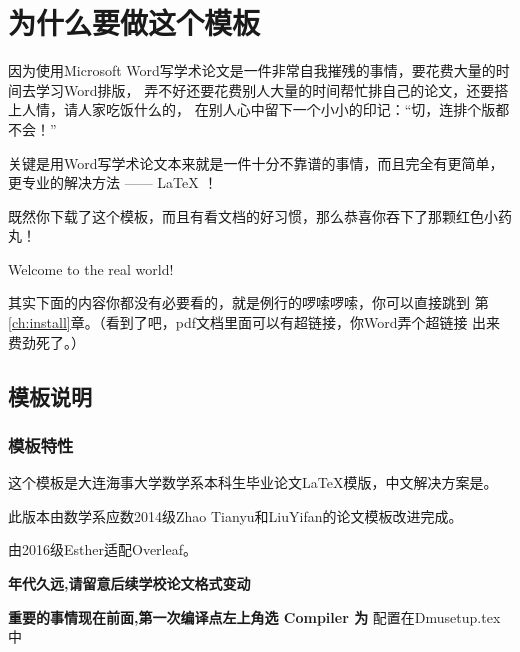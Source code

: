 
\section{为什么要做这个模板}\label{ch:intr}


因为使用Microsoft 
Word写学术论文是一件非常自我摧残的事情，要花费大量的时间去学习Word排版，
弄不好还要花费别人大量的时间帮忙排自己的论文，还要搭上人情，请人家吃饭什么的，
在别人心中留下一个小小的印记：“切，连排个版都不会！”

关键是用Word写学术论文本来就是一件十分不靠谱的事情，而且完全有更简单，更专业的解决方法 —— {\LaTeX} ！

既然你下载了这个模板，而且有看文档的好习惯，那么恭喜你吞下了那颗红色小药丸！

Welcome to the real world!

其实下面的内容你都没有必要看的，就是例行的啰嗦啰嗦，你可以直接跳到
第\ref{ch:install}章。（看到了吧，pdf文档里面可以有超链接，你Word弄个超链接
出来费劲死了。）

\subsection{模板说明}
\label{sec:fastguide}

\subsubsection{模板特性}
\label{sec:features}

这个模板是大连海事大学数学系本科生毕业论文\LaTeX{}模版，中文解决方案是。

此版本由数学系应数2014级Zhao Tianyu和LiuYifan的论文模板改进完成。

由2016级Esther适配Overleaf。

\textbf{年代久远,请留意后续学校论文格式变动}


\textbf{重要的事情现在前面,第一次编译点左上角选 Compiler 为 \XeLaTeX}
配置在Dmusetup.tex中 


